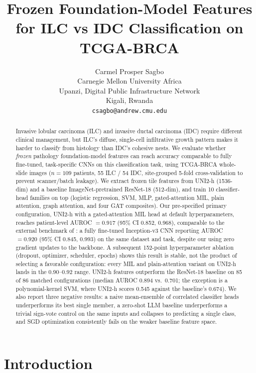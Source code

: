 \documentclass{article}
\title{Frozen Foundation-Model Features for ILC vs IDC Classification on TCGA-BRCA}
\author{%
  Carmel Prosper Sagbo \\
  Carnegie Mellon University Africa \\
  Upanzi, Digital Public Infrastructure Network \\
  Kigali, Rwanda \\
  \texttt{csagbo@andrew.cmu.edu} \\
}
\begin{document}
\maketitle

\begin{abstract}
Invasive lobular carcinoma (ILC) and invasive ductal carcinoma (IDC) require different clinical management, but ILC's diffuse, single-cell infiltrative growth pattern makes it harder to classify from histology than IDC's cohesive nests. We evaluate whether \emph{frozen} pathology foundation-model features can reach accuracy comparable to fully fine-tuned, task-specific CNNs on this classification task, using TCGA-BRCA whole-slide images ($n=109$ patients, 55 ILC / 54 IDC, site-grouped 5-fold cross-validation to prevent scanner/batch leakage). We extract frozen tile features from UNI2-h (1536-dim) and a baseline ImageNet-pretrained ResNet-18 (512-dim), and train 10 classifier-head families on top (logistic regression, SVM, MLP, gated-attention MIL, plain attention, graph attention, and four GAT composites). Our pre-specified primary configuration, UNI2-h with a gated-attention MIL head at default hyperparameters, reaches patient-level AUROC $=0.917$ (95\% CI 0.852, 0.968), comparable to the external benchmark of \citet{ektefaie2021integrative}: a fully fine-tuned Inception-v3 CNN reporting AUROC $=0.920$ (95\% CI 0.845, 0.993) on the same dataset and task, despite our using zero gradient updates to the backbone. A subsequent 152-point hyperparameter ablation (dropout, optimizer, scheduler, epochs) shows this result is stable, not the product of selecting a favorable configuration: every MIL and plain-attention variant on UNI2-h lands in the 0.90--0.92 range. UNI2-h features outperform the ResNet-18 baseline on 85 of 86 matched configurations (median AUROC 0.894 vs.\ 0.701; the exception is a polynomial-kernel SVM, where UNI2-h scores 0.545 against the baseline's 0.674). We also report three negative results: a naive mean-ensemble of correlated classifier heads underperforms its best single member, a zero-shot LLM baseline underperforms a trivial sign-vote control on the same inputs and collapses to predicting a single class, and SGD optimization consistently fails on the weaker baseline feature space.
\end{abstract}

\section{Introduction}
\end{document}
